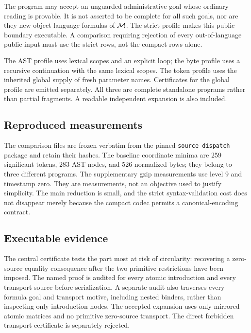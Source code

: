 The program may accept an unguarded administrative goal whose ordinary
reading is provable.  It is not asserted to be complete for all such
goals, nor are they new object-language formulas of $\mathcal M$.  The
strict profile makes this public boundary executable.  A comparison
requiring rejection of every out-of-language public input must use
the strict rows, not the compact rows alone.

The AST profile uses lexical scopes and an explicit loop; the byte
profile uses a recursive continuation with the same lexical scopes.
The token profile uses the inherited global supply of fresh parameter
names.  Certificates for the global profile are emitted separately.
All three are complete standalone programs rather than partial
fragments.  A readable independent expansion is also included.

\subsection{Reproduced measurements}



The comparison files are frozen verbatim from the pinned
\texttt{source\_dispatch} package and retain their hashes.  The
baseline coordinate minima are 259 significant tokens, 283 AST nodes,
and 526 normalized bytes; they belong to three different programs.
The supplementary gzip measurements use level 9 and timestamp zero.
They are measurements, not an objective used to justify simplicity.
The main reduction is small, and the strict syntax-validation cost
does not disappear merely because the compact codec permits a
canonical-encoding contract.

\subsection{Executable evidence}



The central certificate tests the part most at risk of circularity:
recovering a zero-source equality consequence after the two primitive
restrictions have been imposed.  The named proof is audited for every
atomic introduction and every transport source before serialization. A separate audit also traverses every formula goal
and transport motive, including nested binders, rather than inspecting
only introduction nodes.
The accepted expansion uses only mirrored atomic matrices and no
primitive zero-source transport.  The direct forbidden transport
certificate is separately rejected.

